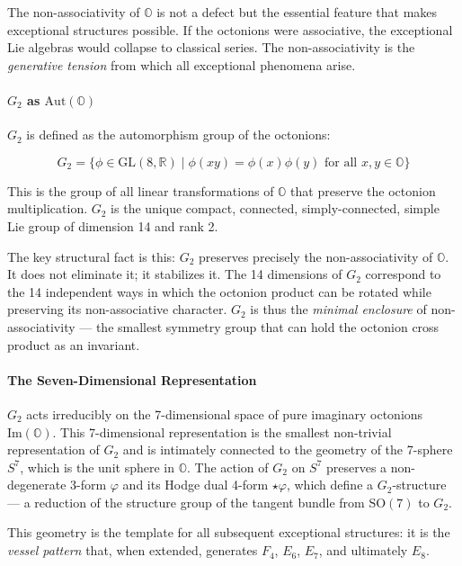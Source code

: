 \documentclass[12pt,a4paper]{article}
\begin{document}
The non-associativity of $\mathbb{O}$ is not a defect but the essential feature that makes exceptional structures possible. If the octonions were associative, the exceptional Lie algebras would collapse to classical series. The non-associativity is the \emph{generative tension} from which all exceptional phenomena arise.

\paragraph{$G_2$ as $\text{Aut}(\mathbb{O})$}

$G_2$ is defined as the automorphism group of the octonions:

\[G_2 = \{ \phi \in \text{GL}(8,\mathbb{R}) \mid \phi(xy) = \phi(x)\phi(y) \text{ for all } x,y \in \mathbb{O} \}\]

This is the group of all linear transformations of $\mathbb{O}$ that preserve the octonion multiplication. $G_2$ is the unique compact, connected, simply-connected, simple Lie group of dimension 14 and rank 2.

The key structural fact is this: $G_2$ preserves precisely the non-associativity of $\mathbb{O}$. It does not eliminate it; it stabilizes it. The 14 dimensions of $G_2$ correspond to the 14 independent ways in which the octonion product can be rotated while preserving its non-associative character. $G_2$ is thus the \emph{minimal enclosure} of non-associativity --- the smallest symmetry group that can hold the octonion cross product as an invariant.

\paragraph{The Seven-Dimensional Representation}

$G_2$ acts irreducibly on the 7-dimensional space of pure imaginary octonions $\text{Im}(\mathbb{O})$. This 7-dimensional representation is the smallest non-trivial representation of $G_2$ and is intimately connected to the geometry of the 7-sphere $S^7$, which is the unit sphere in $\mathbb{O}$. The action of $G_2$ on $S^7$ preserves a non-degenerate 3-form $\varphi$ and its Hodge dual 4-form $\star\varphi$, which define a $G_2$-structure --- a reduction of the structure group of the tangent bundle from $\text{SO}(7)$ to $G_2$.

This geometry is the template for all subsequent exceptional structures: it is the \emph{vessel pattern} that, when extended, generates $F_4$, $E_6$, $E_7$, and ultimately $E_8$.
\end{document}
